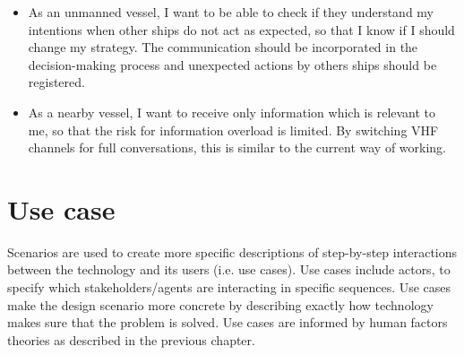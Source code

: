 \begin{itemize}
	\item As an unmanned vessel, I want to be able to check if they understand my intentions when other ships do not act as expected, so that I know if I should change my strategy. The communication should be incorporated in the decision-making process and unexpected actions by others ships should be registered.
	
	\item As a nearby vessel, I want to receive only information which is relevant to me, so that the risk for information overload is limited. By switching \ac{VHF} channels for full conversations, this is similar to the current way of working.
\end{itemize}

\section{Use case}
\label{sec:use-case}
Scenarios are used to create more specific descriptions of step-by-step interactions between the technology and its users (i.e. use cases). Use cases include actors, to specify which stakeholders/agents are interacting in specific sequences.
Use cases make the design scenario more concrete by describing exactly how technology makes sure that the problem is solved. Use cases are informed by human factors theories as described in the previous chapter.


